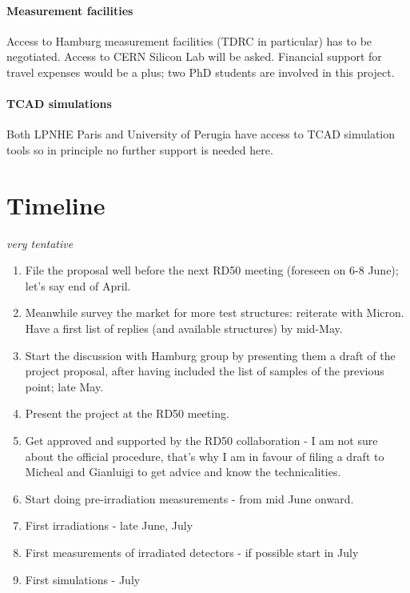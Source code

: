 \documentclass[dvips,12pt]{article}
\begin{document}
\paragraph{Measurement facilities} Access to Hamburg measurement facilities (TDRC in 
particular) has to be negotiated. Access to CERN Silicon Lab will be asked. 
Financial support for travel expenses would be a plus; two 
PhD students are involved in this project.
\paragraph{TCAD simulations}Both LPNHE Paris and University of Perugia have access to 
TCAD simulation tools so in principle no further support is needed here.


\label{sec:resources}

\section{Timeline}
\label{sec:timeline}
{\it very tentative}

\begin{enumerate}[1)]
\item File the proposal well before the next RD50 meeting (foreseen on 6-8 June); let's say end of 
April.
\item Meanwhile survey the market for more test structures: reiterate with Micron. 
Have a first list of replies (and available structures) by mid-May.
\item Start the discussion with Hamburg group by presenting them a draft of the project proposal, 
after having included the list of samples of the previous point; late May.
\item Present the project at the RD50 meeting.
\item Get approved and supported by the RD50 collaboration - I am not sure about the official 
procedure, that's why I am in favour of filing a draft to Micheal and Gianluigi to get advice and know 
the technicalities.
\item Start doing pre-irradiation measurements - from mid June onward.
\item First irradiations - late June, July
\item First measurements of irradiated detectors - if possible start in July
\item First simulations - July
\end{enumerate}

\newpage



\end{document}
